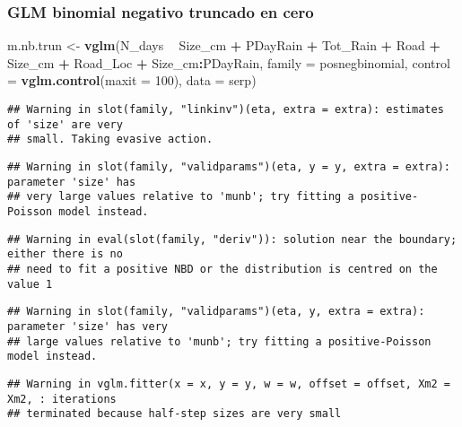 \documentclass[
]{book}
\newenvironment{Shaded}{\begin{snugshade}}{\end{snugshade}}
\newcommand{\DataTypeTok}[1]{\textcolor[rgb]{0.13,0.29,0.53}{#1}}
\newcommand{\DecValTok}[1]{\textcolor[rgb]{0.00,0.00,0.81}{#1}}
\newcommand{\KeywordTok}[1]{\textcolor[rgb]{0.13,0.29,0.53}{\textbf{#1}}}
\newcommand{\NormalTok}[1]{#1}
\newcommand{\OperatorTok}[1]{\textcolor[rgb]{0.81,0.36,0.00}{\textbf{#1}}}
\newcommand{\StringTok}[1]{\textcolor[rgb]{0.31,0.60,0.02}{#1}}
\begin{document}
\hypertarget{glm-binomial-negativo-truncado-en-cero}{%
\subsubsection{GLM binomial negativo truncado en cero}\label{glm-binomial-negativo-truncado-en-cero}}

\begin{Shaded}
\begin{Highlighting}[]
\NormalTok{m.nb.trun <-}\StringTok{ }\KeywordTok{vglm}\NormalTok{(N_days }\OperatorTok{~}\StringTok{ }\NormalTok{Size_cm }\OperatorTok{+}\StringTok{ }\NormalTok{PDayRain }\OperatorTok{+}\StringTok{ }\NormalTok{Tot_Rain }\OperatorTok{+}\StringTok{ }\NormalTok{Road }\OperatorTok{+}\StringTok{ }\NormalTok{Size_cm }\OperatorTok{+}\StringTok{ }\NormalTok{Road_Loc }\OperatorTok{+}\StringTok{ }\NormalTok{Size_cm}\OperatorTok{:}\NormalTok{PDayRain, }\DataTypeTok{family =}\NormalTok{ posnegbinomial, }\DataTypeTok{control =}  \KeywordTok{vglm.control}\NormalTok{(}\DataTypeTok{maxit =} \DecValTok{100}\NormalTok{), }\DataTypeTok{data =}\NormalTok{ serp)}
\end{Highlighting}
\end{Shaded}

\begin{verbatim}
## Warning in slot(family, "linkinv")(eta, extra = extra): estimates of 'size' are very
## small. Taking evasive action.
\end{verbatim}

\begin{verbatim}
## Warning in slot(family, "validparams")(eta, y = y, extra = extra): parameter 'size' has
## very large values relative to 'munb'; try fitting a positive-Poisson model instead.
\end{verbatim}

\begin{verbatim}
## Warning in eval(slot(family, "deriv")): solution near the boundary; either there is no
## need to fit a positive NBD or the distribution is centred on the value 1
\end{verbatim}

\begin{verbatim}
## Warning in slot(family, "validparams")(eta, y, extra = extra): parameter 'size' has very
## large values relative to 'munb'; try fitting a positive-Poisson model instead.
\end{verbatim}

\begin{verbatim}
## Warning in vglm.fitter(x = x, y = y, w = w, offset = offset, Xm2 = Xm2, : iterations
## terminated because half-step sizes are very small
\end{verbatim}
\end{document}
